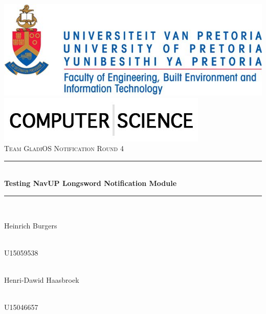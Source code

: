 \begin{titlepage}
	\begin{center}
		\includegraphics[width=0.7\linewidth]{uniLogo.jpg}\\[1cm]
		\includegraphics[width=0.7\linewidth]{headerCS.jpg}\\[1cm]  
		\textsc{\LARGE Team GladiOS Notification Round 4}\\[0.3cm]
		\rule{\linewidth}{0.5mm} \\[1cm]
		{ \huge \bfseries Testing NavUP Longsword Notification Module}\\[0.5cm]
		\rule{\linewidth}{0.5mm} \\[1cm] 			
		  
		  
		\begin{minipage}{0.4\textwidth}
			\begin{flushleft} \large
				Heinrich {Burgers}
			\end{flushleft}
		\end{minipage}
		\begin{minipage}{0.4\textwidth}
			\begin{flushright} \large
				\emph{} \\
				U15059538
			\end{flushright}
		\end{minipage}
		
		
		\begin{minipage}{0.4\textwidth}
			\begin{flushleft} \large
				\emph{} \\
				Henri-Dawid {Haasbroek}
			\end{flushleft}
		\end{minipage}
		\begin{minipage}{0.4\textwidth}
			\begin{flushright} \large
				\emph{} \\
				U15046657
			\end{flushright}
		\end{minipage}
		

\end{center}
\end{titlepage}
